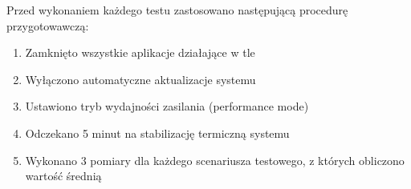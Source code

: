 Przed wykonaniem każdego testu zastosowano następującą procedurę przygotowawczą:
\begin{enumerate}
    \item Zamknięto wszystkie aplikacje działające w tle
    \item Wyłączono automatyczne aktualizacje systemu
    \item Ustawiono tryb wydajności zasilania (performance mode)
    \item Odczekano 5 minut na stabilizację termiczną systemu
    \item Wykonano 3 pomiary dla każdego scenariusza testowego, z których obliczono wartość średnią
\end{enumerate}
